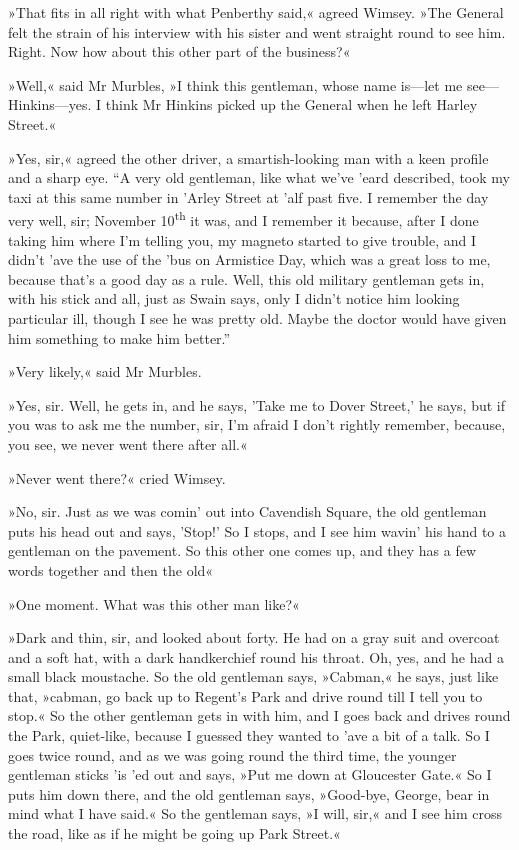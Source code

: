»That fits in all right with what Penberthy said,« agreed Wimsey. »The General felt the strain of his interview with his sister and went straight round to see him. Right. Now how about this other part of the business?«

»Well,« said Mr Murbles, »I think this gentleman, whose name is\allowbreak---\allowbreak let me see\allowbreak---\allowbreak Hinkins---yes. I think Mr Hinkins picked up the General when he left Harley Street.«

»Yes, sir,« agreed the other driver, a smartish-looking man with a keen profile and a sharp eye. \enquote{A very old gentleman, like what we've 'eard described, took my taxi at this same number in 'Arley Street at 'alf past five. I remember the day very well, sir; November  10\textsuperscript{th} it was, and I remember it because, after I done taking him where I'm telling you, my magneto started to give trouble, and I didn't 'ave the use of the 'bus on Armistice Day, which was a great loss to me, because that's a good day as a rule. Well, this old military gentleman gets in, with his stick and all, just as Swain says, only I didn't notice him looking particular ill, though I see he was pretty old. Maybe the doctor would have given him something to make him better.}

»Very likely,« said Mr Murbles.

»Yes, sir. Well, he gets in, and he says, 'Take me to Dover Street,' he says, but if you was to ask me the number, sir, I'm afraid I don't rightly remember, because, you see, we never went there after all.«

»Never went there?« cried Wimsey.

»No, sir. Just as we was comin' out into Cavendish Square, the old gentleman puts his head out and says, 'Stop!' So I stops, and I see him wavin' his hand to a gentleman on the pavement. So this other one comes up, and they has a few words together and then the old\longdash«

»One moment. What was this other man like?«

»Dark and thin, sir, and looked about forty. He had on a gray suit and overcoat and a soft hat, with a dark handkerchief round his throat. Oh, yes, and he had a small black moustache. So the old gentleman says, »Cabman,« he says, just like that, »cabman, go back up to Regent's Park and drive round till I tell you to stop.« So the other gentleman gets in with him, and I goes back and drives round the Park, quiet-like, because I guessed they wanted to 'ave a bit of a talk. So I goes twice round, and as we was going round the third time, the younger gentleman sticks 'is 'ed out and says, »Put me down at Gloucester Gate.« So I puts him down there, and the old gentleman says, »Good-bye, George, bear in mind what I have said.« So the gentleman says, »I will, sir,« and I see him cross the road, like as if he might be going up Park Street.«

